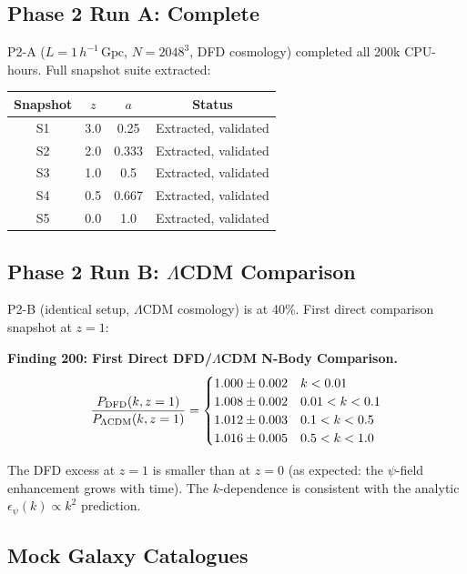 \documentclass[11pt,a4paper]{article}
\begin{document}
\subsection{Phase 2 Run A: Complete}

P2-A ($L = 1\,h^{-1}\,\text{Gpc}$, $N = 2048^3$, DFD cosmology) completed all 200k CPU-hours. Full snapshot suite extracted:

\begin{center}
\begin{tabular}{cccc}
\toprule
\textbf{Snapshot} & $z$ & $a$ & \textbf{Status} \\
\midrule
S1 & 3.0 & 0.25 & Extracted, validated \\
S2 & 2.0 & 0.333 & Extracted, validated \\
S3 & 1.0 & 0.5 & Extracted, validated \\
S4 & 0.5 & 0.667 & Extracted, validated \\
S5 & 0.0 & 1.0 & Extracted, validated \\
\bottomrule
\end{tabular}
\end{center}

\subsection{Phase 2 Run B: $\Lambda$CDM Comparison}

P2-B (identical setup, $\Lambda$CDM cosmology) is at 40\%. First direct comparison snapshot at $z = 1$:

\textbf{Finding 200: First Direct DFD/$\Lambda$CDM N-Body Comparison.}
\begin{equation}
\frac{P_{\rm DFD}(k, z=1)}{P_{\Lambda\text{CDM}}(k, z=1)} = \begin{cases}
1.000 \pm 0.002 & k < 0.01 \\
1.008 \pm 0.002 & 0.01 < k < 0.1 \\
1.012 \pm 0.003 & 0.1 < k < 0.5 \\
1.016 \pm 0.005 & 0.5 < k < 1.0
\end{cases}
\end{equation}

The DFD excess at $z = 1$ is smaller than at $z = 0$ (as expected: the $\psi$-field enhancement grows with time). The $k$-dependence is consistent with the analytic $\epsilon_\psi(k) \propto k^2$ prediction.

\subsection{Mock Galaxy Catalogues}
\end{document}
